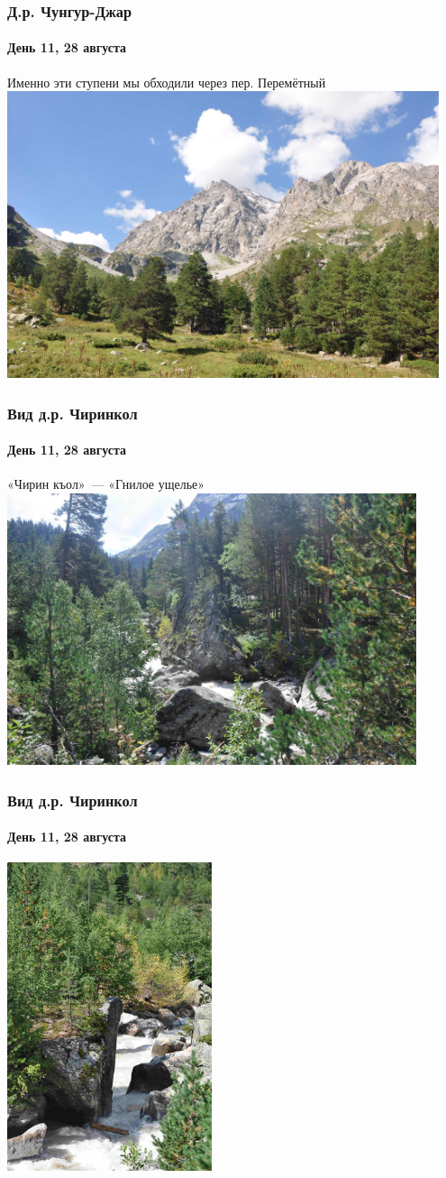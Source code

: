 \begin{frame}
	\frametitle{Д.р. Чунгур-Джар}
	\framesubtitle{День 11, 28 августа}	
	\footnotesize Именно эти ступени мы обходили через пер. Перемётный
	\centering
	\includegraphics[width=0.95\textwidth]{../pics/DSC_0459 2}			
\end{frame}

\begin{frame}
	\frametitle{Вид д.р. Чиринкол}
	\framesubtitle{День 11, 28 августа}	
	\footnotesize«Чирин къол»~--- «Гнилое ущелье»
	\centering
	\includegraphics[width=0.9\textwidth]{../pics/DSC_0461 2}			
\end{frame}

\begin{frame}
	\frametitle{Вид д.р. Чиринкол}
	\framesubtitle{День 11, 28 августа}	
	\centering
	\includegraphics[width=0.45\textwidth]{../pics/DSC_0460 2}			
\end{frame}

